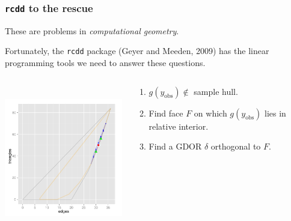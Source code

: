 \documentclass[slidestop,compress, 10pt]{beamer}
\newcommand{\yobs}{y_{\text{obs}}}
\begin{document}
\frame
{

\frametitle{\texttt{rcdd} to the rescue}  
These are problems in \emph{computational geometry}.  

Fortunately, the \texttt{rcdd} package (Geyer and Meeden, 2009) has the 
linear programming tools we need to answer these questions.

\begin{columns}[T]
\begin{column}[T]{0.25\textwidth}
\includegraphics[height=2.5in,trim=3.5in 2in 0.15in 0.05in,clip=true]{MCsample-77face} %
\end{column}
\begin{column}[T]{0.75\textwidth}
\vspace{2mm}

\begin{enumerate}
\item $g(\yobs) \notin$ sample hull.  

\item Find face $F$ on which $g(\yobs)$ lies in relative interior.  

\item Find a GDOR $\delta$ orthogonal to $F$.  

\end{enumerate}
\end{column}
\end{columns}
}
\end{document}
